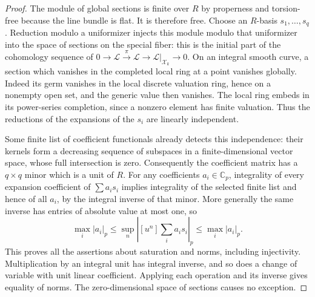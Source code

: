 \begin{proof}
The module of global sections is finite over $R$ by properness
and torsion-free because the line bundle is flat.  It is therefore
free.  Choose an $R$-basis $s_1,\ldots,s_q$.
Reduction modulo a uniformizer injects this module modulo that
uniformizer into the space of sections on the special fiber:
this is the initial part of the cohomology sequence of
$0\to\mathscr L\xrightarrow{\pi}\mathscr L
\to\mathscr L|_{\mathscr X_k}\to0$.
On an integral smooth curve, a section which vanishes in the
completed local ring at a point vanishes globally.  Indeed its
germ vanishes in the local discrete valuation ring, hence on a
nonempty open set, and the generic value then vanishes.  The
local ring embeds in its power-series completion, since a
nonzero element has finite valuation.  Thus the reductions of
the expansions of the $s_i$ are linearly independent.

Some finite list of coefficient functionals already detects this
independence: their kernels form a decreasing sequence of
subspaces in a finite-dimensional vector space, whose full
intersection is zero.  Consequently the coefficient matrix has
a $q\times q$ minor which is a unit of $R$.
For any coefficients $a_i\in\mathbb C_p$, integrality of every
expansion coefficient of $\sum a_i s_i$ implies integrality of
the selected finite list and hence of all $a_i$, by the integral
inverse of that minor.  More generally the same inverse has
entries of absolute value at most one, so
\[
 \max_i|a_i|_p\le
   \sup_n|[u^n]\textstyle\sum_i a_i s_i|_p
                  \le\max_i|a_i|_p.
\]
This proves all the assertions about saturation and norms,
including injectivity.  Multiplication by an integral unit has
integral inverse, and so does a change of variable with unit
linear coefficient.  Applying each operation and its inverse
gives equality of norms.  The zero-dimensional space of sections
causes no exception.
\end{proof}

